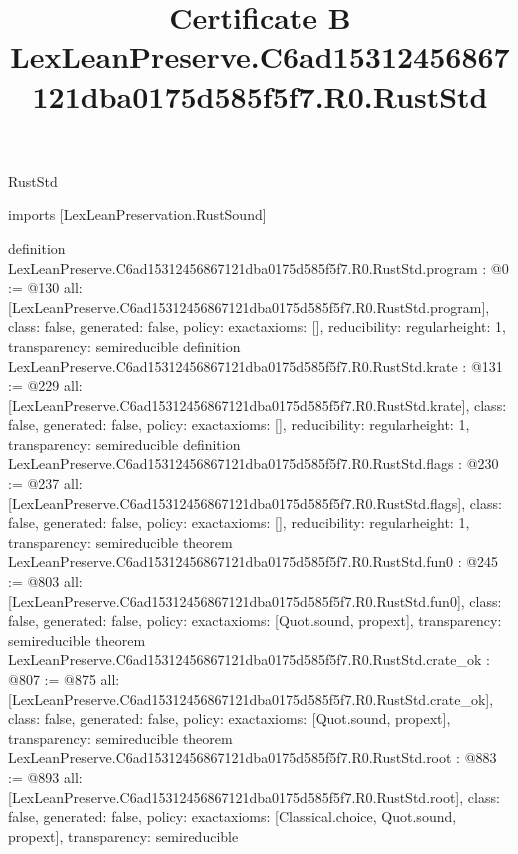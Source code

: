 \begin{lexlean}{RustStd}
\title{Certificate B LexLeanPreserve.C6ad15312456867121dba0175d585f5f7.R0.RustStd}
\begin{coremodule}
imports [LexLeanPreservation.RustSound]

definition LexLeanPreserve.C6ad15312456867121dba0175d585f5f7.R0.RustStd.program : @0 := @130 {
  all: [LexLeanPreserve.C6ad15312456867121dba0175d585f5f7.R0.RustStd.program],
  class: false,
  generated: false,
  policy: exact{axioms: []},
  reducibility: regular{height: 1},
  transparency: semireducible
}
definition LexLeanPreserve.C6ad15312456867121dba0175d585f5f7.R0.RustStd.krate : @131 := @229 {
  all: [LexLeanPreserve.C6ad15312456867121dba0175d585f5f7.R0.RustStd.krate],
  class: false,
  generated: false,
  policy: exact{axioms: []},
  reducibility: regular{height: 1},
  transparency: semireducible
}
definition LexLeanPreserve.C6ad15312456867121dba0175d585f5f7.R0.RustStd.flags : @230 := @237 {
  all: [LexLeanPreserve.C6ad15312456867121dba0175d585f5f7.R0.RustStd.flags],
  class: false,
  generated: false,
  policy: exact{axioms: []},
  reducibility: regular{height: 1},
  transparency: semireducible
}
theorem LexLeanPreserve.C6ad15312456867121dba0175d585f5f7.R0.RustStd.fun0 : @245 := @803 {
  all: [LexLeanPreserve.C6ad15312456867121dba0175d585f5f7.R0.RustStd.fun0],
  class: false,
  generated: false,
  policy: exact{axioms: [Quot.sound, propext]},
  transparency: semireducible
}
theorem LexLeanPreserve.C6ad15312456867121dba0175d585f5f7.R0.RustStd.crate_ok : @807 := @875 {
  all: [LexLeanPreserve.C6ad15312456867121dba0175d585f5f7.R0.RustStd.crate_ok],
  class: false,
  generated: false,
  policy: exact{axioms: [Quot.sound, propext]},
  transparency: semireducible
}
theorem LexLeanPreserve.C6ad15312456867121dba0175d585f5f7.R0.RustStd.root : @883 := @893 {
  all: [LexLeanPreserve.C6ad15312456867121dba0175d585f5f7.R0.RustStd.root],
  class: false,
  generated: false,
  policy: exact{axioms: [Classical.choice, Quot.sound, propext]},
  transparency: semireducible
}


\end{coremodule}
\end{lexlean}
